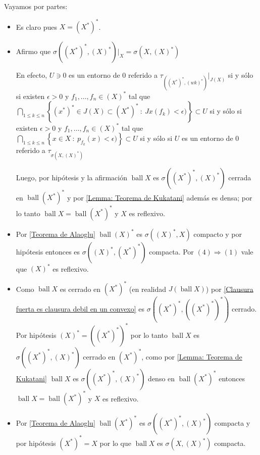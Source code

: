 \documentclass[11pt]{article}
\newcommand\tq{~:~}
\newcommand{\dual}[1]{\left(#1\right)^{\ast}}
\newcommand{\ddual}[1]{\left(#1^{\ast}\right)^{\ast}}
\newcommand{\sett}[1]{\left\lbrace#1\right\rbrace}
\newcommand{\Bigcap}[2]{\bigcap\limits_{#1}{#2}}
\DeclareMathOperator{\ball}{ball}
\numberwithin{theorem}{subsection}
\newenvironment{proof}[1][Demostraci\'on]{\begin{trivlist}
		\item[\hskip \labelsep {\bfseries #1}]}{\end{trivlist}}
\newcommand{\qed}{\nobreak \ifvmode \relax \else
	\ifdim\lastskip<1.5em \hskip-\lastskip
	\hskip1.5em plus0em minus0.5em \fi \nobreak
	\vrule height0.75em width0.5em depth0.25em\fi}
\begin{document}
\begin{proof}
	Vayamos por partes:
	
	\begin{itemize}
		
		\item[$(1) \Longrightarrow (3)$] Es claro pues $X = \ddual{X}$.
		\item[$(4) \Longrightarrow (1)$] Afirmo que $\sigma \left(\ddual{X}, \dual{X}\right) \vert_{X} = \sigma \left(X, \dual{X}\right)$
		
		En efecto, $U \ni 0$ es un entorno de $0$ referido a $\tau_{\left(\ddual{X}, \dual{wk}\right)} \vert_{J(X)}$ si y s\'olo si existen $\epsilon > 0$ y $f_1 , \dots , f_n \in \dual{X}$ tal que $\Bigcap{1 \leq k \leq n}{\sett{\ddual{x} \in J(X) \subset \ddual{X} \tq {Jx}(f_k) < \epsilon)}} \subset U$ si y s\'olo si existen $\epsilon > 0$ y $f_1 , \dots , f_n \in \dual{X}$ tal que $\Bigcap{1 \leq k \leq n}{\sett{x \in X \tq p_{f_k}(x) < \epsilon)}} \subset U$ si y s\'olo si $U$ es un entorno de $0$ referido a $\tau_{\sigma \left(X, \dual{X}\right)}$
		
		Luego, por hip\'otesis y la afirmaci\'on $\ball X$ es $\sigma(\ddual{X}, \dual{X})$ cerrada en $\ball \ddual{X}$ y por \ref{Lemma: Teorema de Kukatani} adem\'as es densa; por lo tanto $\ball X = \ball \ddual{X}$ y $X$ es reflexivo.
		
		\item[$(3) \Longrightarrow (2)$] Por \ref{Teorema de Alaoglu} $\ball \dual{X}$ es $\sigma \left(\dual{X}, X\right)$ compacto y por hip\'otesis entonces es $\sigma \left(\dual{X}, \ddual{X}\right)$ compacta. Por $(4) \Longrightarrow (1)$ vale que $\dual{X}$ es reflexivo.
		
		\item[$(2) \Longrightarrow (1)$] Como $\ball X$ es cerrado en $\ddual{X}$ (en realidad $J(\ball X)$) por \ref{Clausura fuerta es clausura debil en un convexo} es $\sigma \left(\ddual{X}, \dual{\ddual{X}}\right)$ cerrado. Por hip\'otesis $\dual{X} = \dual{\ddual{X}}$ por lo tanto $\ball X$ es $\sigma \left(\ddual{X}, \dual{X}\right)$ cerrado en $\ddual{X}$, como por \ref{Lemma: Teorema de Kukatani} $\ball X$ es $\sigma \left(\ddual{X}, \dual{X}\right)$ denso en $\ball \ddual{X}$ entonces $\ball X  = \ball \ddual{X}$ y $X$ es reflexivo.
		
		\item[$(1) \Longrightarrow (4)$] Por \ref{Teorema de Alaoglu} $\ball \ddual{X}$ es $\sigma \left(\ddual{X}, \dual{X}\right)$ compacta y por hip\'otesis $\ddual{X} = X$ por lo que $\ball X$ es $\sigma \left(X, \dual{X}\right)$ compacta. \qed
		
	\end{itemize}
	
\end{proof}
\end{document}
